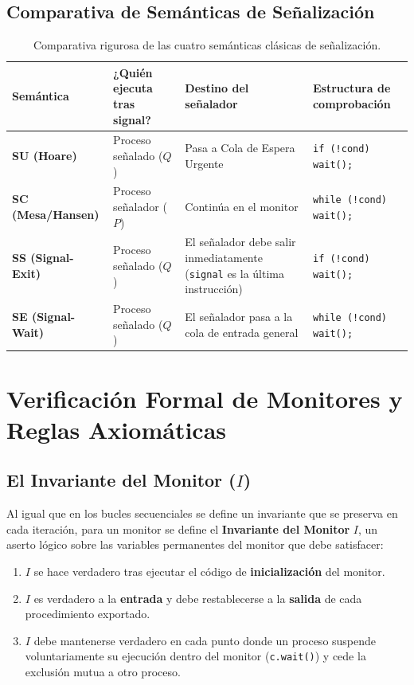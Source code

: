 \subsection{Comparativa de Semánticas de Señalización}
\begin{table}[htbp]
\centering
\small
\begin{tabular}{>{\raggedright\arraybackslash}p{2.2cm}>{\raggedright\arraybackslash}p{3.8cm}>{\raggedright\arraybackslash}p{4.2cm}>{\raggedright\arraybackslash}p{3.4cm}}
\toprule
\textbf{Semántica} & \textbf{¿Quién ejecuta tras signal?} & \textbf{Destino del señalador} & \textbf{Estructura de comprobación} \\
\midrule
\textbf{SU (Hoare)} & Proceso señalado ($Q$) & Pasa a Cola de Espera Urgente & \texttt{if (!cond) wait();} \\
\addlinespace
\textbf{SC (Mesa/Hansen)} & Proceso señalador ($P$) & Continúa en el monitor & \texttt{while (!cond) wait();} \\
\addlinespace
\textbf{SS (Signal-Exit)} & Proceso señalado ($Q$) & El señalador debe salir inmediatamente (\texttt{signal} es la última instrucción) & \texttt{if (!cond) wait();} \\
\addlinespace
\textbf{SE (Signal-Wait)} & Proceso señalado ($Q$) & El señalador pasa a la cola de entrada general & \texttt{while (!cond) wait();} \\
\bottomrule
\end{tabular}
\caption{Comparativa rigurosa de las cuatro semánticas clásicas de señalización.}
\label{tab:semanticas_senales}
\end{table}

\section{Verificación Formal de Monitores y Reglas Axiomáticas}

\subsection{El Invariante del Monitor (\texorpdfstring{$I$}{I})}
Al igual que en los bucles secuenciales se define un invariante que se preserva en cada iteración, para un monitor se define el \textbf{Invariante del Monitor} $I$, un aserto lógico sobre las variables permanentes del monitor que debe satisfacer:
\begin{enumerate}[leftmargin=*]
    \item $I$ se hace verdadero tras ejecutar el código de \textbf{inicialización} del monitor.
    \item $I$ es verdadero a la \textbf{entrada} y debe restablecerse a la \textbf{salida} de cada procedimiento exportado.
    \item $I$ debe mantenerse verdadero en cada punto donde un proceso suspende voluntariamente su ejecución dentro del monitor (\texttt{c.wait()}) y cede la exclusión mutua a otro proceso.
\end{enumerate}

